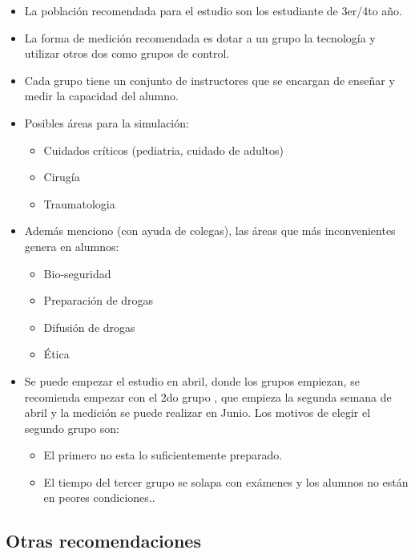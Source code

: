 \begin{itemize}
\itemsep1pt\parskip0pt
\item
  La población recomendada para el estudio son los estudiante de 3er/4to
  año.
\item
  La forma de medición recomendada es dotar a un grupo la tecnología y
  utilizar otros dos como grupos de control.
\item
  Cada grupo tiene un conjunto de instructores que se encargan de
  enseñar y medir la capacidad del alumno.
\item
  Posibles áreas para la simulación:

  \begin{itemize}
  \itemsep1pt\parskip0pt
  \item
    Cuidados críticos (pediatria, cuidado de adultos)
  \item
    Cirugía
  \item
    Traumatologia
  \end{itemize}
\item
  Además menciono (con ayuda de colegas), las áreas que más
  inconvenientes genera en alumnos:

  \begin{itemize}
  \itemsep1pt\parskip0pt
  \item
    Bio-seguridad
  \item
    Preparación de drogas
  \item
    Difusión de drogas
  \item
    Ética
  \end{itemize}
\item
  Se puede empezar el estudio en abril, donde los grupos empiezan, se
  recomienda empezar con el 2do grupo , que empieza la segunda semana de
  abril y la medición se puede realizar en Junio. Los motivos de elegir
  el segundo grupo son:

  \begin{itemize}
  \itemsep1pt\parskip0pt
  \item
    El primero no esta lo suficientemente preparado.
  \item
    El tiempo del tercer grupo se solapa con exámenes y los alumnos no
    están en peores condiciones..
  \end{itemize}
\end{itemize}

\subsection{Otras recomendaciones}


